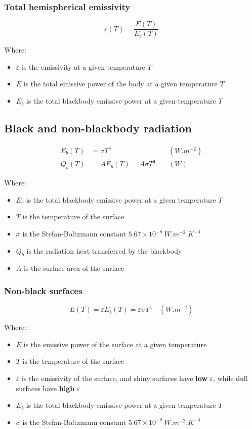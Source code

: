 \documentclass[11pt]{article}
\begin{document}
\subsubsection{Total hemispherical emissivity}
\label{sec:orga0d5ab6}
\[\varepsilon (T) = \frac{E(T)}{E_b(T)}\]

Where:
\begin{itemize}
\item \(\varepsilon\) is the emissivity at a given temperature \(T\)
\item \(E\) is the total emissive power of the body at a given temperature \(T\)
\item \(E_b\) is the total blackbody emissive power at a given temperature \(T\)
\end{itemize}
\subsection{Black and non-blackbody radiation}
\label{sec:org17ecab2}
\begin{align*}
E_b (T) &= \sigma T^4 \quad & (\unit{W.m^{-2}}) \\
Q_b (T) &= AE_b (T) = A \sigma T^4 \quad & (\unit{W})
\end{align*}

Where:
\begin{itemize}
\item \(E_b\) is the total blackbody emissive power at a given temperature \(T\)
\item \(T\) is the temperature of the surface
\item \(\sigma\) is the Stefan-Boltzmann constant \(5.67 \times 10^{-8} \ \unit{W.m^{-2}.K^{-4}}\)
\item \(Q_b\) is the radiation heat transferred by the blackbody
\item \(A\) is the surface area of the surface
\end{itemize}
\subsubsection{Non-black surfaces}
\label{sec:orgffa4c8a}
\[E(T) = \varepsilon E_b (T) = \varepsilon \sigma T^4 \quad (\unit{W.m^{-2}})\]

Where:
\begin{itemize}
\item \(E\) is the emissive power of the surface at a given temperature
\item \(T\) is the temperature of the surface
\item \(\varepsilon\) is the emissivity of the surface, and shiny surfaces have \textbf{low} \(\varepsilon\), while dull surfaces have \textbf{high} \(\varepsilon\)
\item \(E_b\) is the total blackbody emissive power at a given temperature \(T\)
\item \(\sigma\) is the Stefan-Boltzmann constant \(5.67 \times 10^{-8} \ \unit{W.m^{-2}.K^{-4}}\)
\end{itemize}
\end{document}
